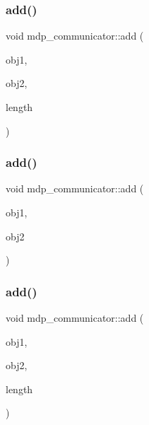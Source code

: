 \mbox{\label{classmdp__communicator_aba7a8da3cb9ef8f8fe782864fdfb4e48}} 
\subsubsection{\texorpdfstring{add()}{add()}\hspace{0.1cm}{\footnotesize\ttfamily [2/15]}}
{\footnotesize\ttfamily void mdp\+\_\+communicator\+::add (\begin{DoxyParamCaption}\item[{float $\ast$}]{obj1,  }\item[{float $\ast$}]{obj2,  }\item[{\hyperlink{mdp__global__vars_8h_aaa1ad9d0dcd2124aa5af0120d9954174}{mdp\+\_\+int}}]{length }\end{DoxyParamCaption})\hspace{0.3cm}{\ttfamily [inline]}}

\mbox{\label{classmdp__communicator_a6386050a1fa9b536ab8eae4bc922fbad}} 
\subsubsection{\texorpdfstring{add()}{add()}\hspace{0.1cm}{\footnotesize\ttfamily [3/15]}}
{\footnotesize\ttfamily void mdp\+\_\+communicator\+::add (\begin{DoxyParamCaption}\item[{double \&}]{obj1,  }\item[{double \&}]{obj2 }\end{DoxyParamCaption})\hspace{0.3cm}{\ttfamily [inline]}}

\mbox{\label{classmdp__communicator_a03f093e5354811e65cd862b6400b51de}} 
\subsubsection{\texorpdfstring{add()}{add()}\hspace{0.1cm}{\footnotesize\ttfamily [4/15]}}
{\footnotesize\ttfamily void mdp\+\_\+communicator\+::add (\begin{DoxyParamCaption}\item[{double $\ast$}]{obj1,  }\item[{double $\ast$}]{obj2,  }\item[{\hyperlink{mdp__global__vars_8h_aaa1ad9d0dcd2124aa5af0120d9954174}{mdp\+\_\+int}}]{length }\end{DoxyParamCaption})\hspace{0.3cm}{\ttfamily [inline]}}


